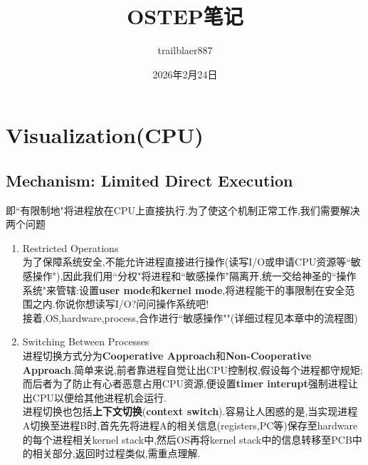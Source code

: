 \documentclass{article}
\title{OSTEP笔记}
\author{trailblaer887}
\date{2026年2月24日}
\begin{document}
\maketitle
\tableofcontents
\section{Visualization(CPU)}

\subsection{Mechanism: Limited Direct Execution}
即``有限制地"将进程放在CPU上直接执行.为了使这个机制正常工作,我们需要解决两个问题
\begin{enumerate}
    \item Restricted Operations \\
    为了保障系统安全,不能允许进程直接进行操作(读写I/O或申请CPU资源等``敏感操作"),因此我们用``分权"将进程和``敏感操作"隔离开,统一交给神圣的``操作系统"来管辖:设置\textbf{user mode}和\textbf{kernel mode},将进程能干的事限制在安全范围之内.你说你想读写I/O?问问操作系统吧! \\
    接着,OS,hardware,process,合作进行``敏感操作""(详细过程见本章中的流程图)
    
    \item Switching Between Processes \\
    进程切换方式分为\textbf{Cooperative Approach}和\textbf{Non-Cooperative Approach}.简单来说,前者靠进程自觉让出CPU控制权,假设每个进程都守规矩;而后者为了防止有心者恶意占用CPU资源,便设置\textbf{timer interupt}强制进程让出CPU以便给其他进程机会运行. \\
    进程切换也包括\textbf{上下文切换}(\textbf{context switch}).容易让人困惑的是,当实现进程A切换至进程B时,首先先将进程A的相关信息(registers,PC等)保存至hardware的每个进程相关kernel stack中,然后OS再将kernel stack中的信息转移至PCB中的相关部分,返回时过程类似,需重点理解.
\end{enumerate}
\end{document}
